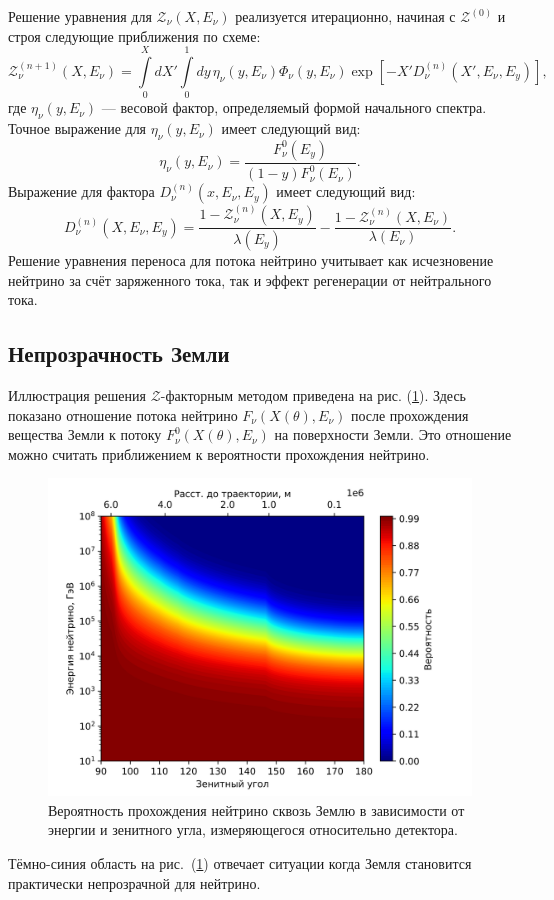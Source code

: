 Решение уравнения для $\mathcal{Z}_{\nu}(X,E_\nu)$ реализуется итерационно, начиная с $\mathcal{Z}^{(0)}$ и строя следующие приближения по схеме:
\begin{equation}
\mathcal{Z}^{(n+1)}_{\nu}(X,E_\nu) = \int\limits_0^X dX' \int\limits_0^1 dy\,\eta_{\nu}(y,E_\nu)\Phi_{\nu}(y,E_\nu)\exp\left[ -X'D^{(n)}_{\nu}(X',E_\nu,E_y) \right],
\end{equation}
где $\eta_{\nu}(y,E_\nu)$ — весовой фактор, определяемый формой начального спектра. Точное выражение для $\eta_{\nu}(y,E_\nu)$ имеет следующий вид: 
\begin{equation}
    \eta_{\nu}(y,E_\nu) = \frac{F^0_{\nu}(E_y)}{(1-y)F^0_{\nu}(E_\nu)}.
\end{equation}
Выражение для фактора $D^{(n)}_{\nu}(x, E_\nu, E_y)$ имеет следующий вид:
\begin{equation}
    D^{(n)}_{\nu}(X, E_\nu, E_y) = \frac{1-\mathcal{Z}_{\nu}^{(n)}(X, E_y)}{\lambda(E_y)} - \frac{1-\mathcal{Z}_{\nu}^{(n)}(X, E_\nu)}{\lambda(E_\nu)}.
\end{equation}
Решение уравнения переноса для потока нейтрино учитывает как исчезновение нейтрино за счёт заряженного тока, так и эффект регенерации от нейтрального тока. 

\subsection{Непрозрачность Земли}
Иллюстрация решения $\mathcal{Z}$-факторным методом приведена на  рис. (\ref{EF2}). Здесь показано отношение потока нейтрино $F_\nu(X(\theta),E_\nu)$  после прохождения вещества Земли к потоку $F_\nu^0(X(\theta),E_\nu)$ на поверхности Земли. Это  отношение можно считать приближением к вероятности прохождения нейтрино.
\begin{figure}[!h]
\centering
\includegraphics[width=0.8\linewidth]{images/NuProp/rzf_2dxsCT10nlo.png}
\caption{Вероятность прохождения нейтрино сквозь Землю в зависимости от энергии и зенитного угла, измеряющегося относительно детектора.}
\label{EF2}
\end{figure}
Тёмно-синия область на рис.~(\ref{EF2}) отвечает ситуации когда Земля становится практически непрозрачной для нейтрино.

